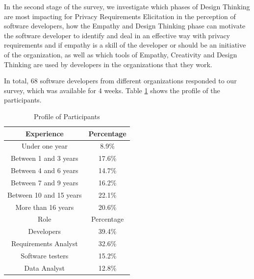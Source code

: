 \documentclass[conference]{IEEEtran}
\begin{document}

In the second stage of the survey, we investigate which phases of Design Thinking are most impacting for Privacy Requirements Elicitation in the perception of software developers, how the Empathy and Design Thinking phase can motivate the software developer to identify and deal in an effective way with privacy requirements and if empathy is a skill of the developer or should be an initiative of the organization, as well as which tools of Empathy, Creativity and Design Thinking are used by developers in the organizations that they work.


In total, 68 software developers from different organizations responded to our survey, which was available for 4 weeks. Table \ref{profile} shows the profile of the participants.

\begin{table}[!htb]
\renewcommand{\arraystretch}{1.3}
\caption{Profile of Participants}
\label{profile}
\centering
\begin{tabular}{|c|c|}
\hline
Experience & Percentage \\
\hline
Under one year & 8.9\%  \\ \hline
Between 1 and 3 years & 17.6\%  \\ \hline
Between 4 and 6 years & 14.7\%  \\ \hline
Between 7 and 9 years & 16.2\%  \\ \hline
Between 10 and 15 years & 22.1\%  \\ \hline
More than 16 years & 20.6\%  \\ \hline
Role & Percentage \\ \hline
Developers & 39.4\% \\ \hline
Requirements Analyst & 32.6\% \\ \hline
Software testers & 15.2\% \\ \hline
Data Analyst & 12.8\% \\ \hline
\end{tabular}
\end{table}
\end{document}
